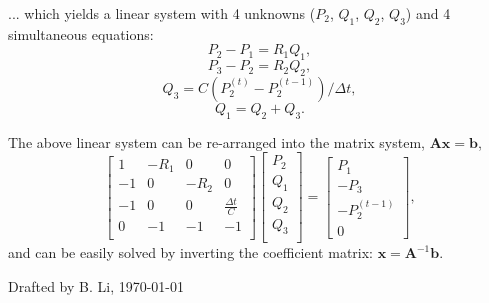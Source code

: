 \documentclass[a4paper]{article}
\begin{document}
\begin{minipage}{0.5\textwidth}
    
\end{minipage}
\hfill
\begin{minipage}{0.5\textwidth}
... which yields a linear system with 4 unknowns ($P_2$, $Q_1$, $Q_2$, $Q_3$) and 4 simultaneous equations:
\begin{equation}
    P_2 - P_1 = R_1 Q_1,
\end{equation}
\begin{equation}
    P_3 - P_2 = R_2 Q_2,
\end{equation}
\begin{equation}
    Q_3 = C (P_2^{(t)} - P_2^{(t-1)})/\Delta t,
\end{equation}
\begin{equation}
    Q_1 = Q_2 + Q_3.
\end{equation}
\end{minipage}

The above linear system can be re-arranged into the matrix system, $\mathbf{A}\mathbf{x} = \mathbf{b}$,
\[
    \begin{bmatrix}
        1 & -R_1 & 0 & 0 \\
        -1 & 0 & -R_2 & 0 \\
        -1 & 0 & 0 & \frac{\Delta t}{C} \\
        0 & -1 & -1 & -1\\
    \end{bmatrix}
    \begin{bmatrix}
        P_2 \\
        Q_1 \\
        Q_2 \\
        Q_3\\
    \end{bmatrix}
    =
    \begin{bmatrix}
        P_1 \\
        -P_3 \\
        -P_2^{(t-1)} \\
        0
    \end{bmatrix},
\]
and can be easily solved by inverting the coefficient matrix: $\mathbf{x} = \mathbf{A}^{-1}\mathbf{b}$.

\vfill
{\small \color{gray}Drafted by B. Li, \today}

\end{document}

